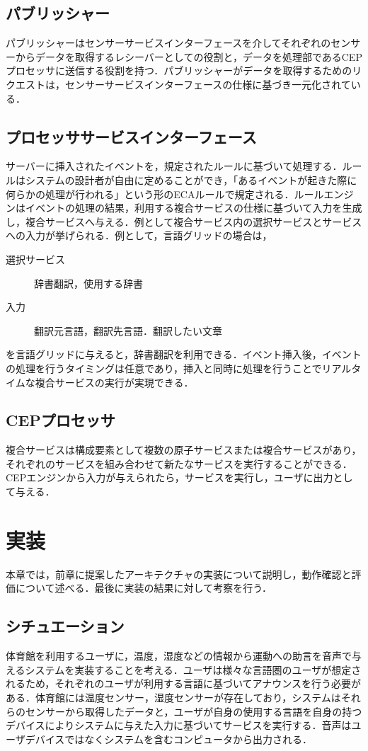 \documentclass{kuisthesis}			%
\begin{document}
\subsection{パブリッシャー}
パブリッシャーはセンサーサービスインターフェースを介してそれぞれのセンサーからデータを取得するレシーバーとしての役割と，データを処理部であるCEPプロセッサに送信する役割を持つ．パブリッシャーがデータを取得するためのリクエストは，センサーサービスインターフェースの仕様に基づき一元化されている．
\subsection{プロセッササービスインターフェース}
サーバーに挿入されたイベントを，規定されたルールに基づいて処理する．ルールはシステムの設計者が自由に定めることができ，「あるイベントが起きた際に何らかの処理が行われる」という形のECAルールで規定される．ルールエンジンはイベントの処理の結果，利用する複合サービスの仕様に基づいて入力を生成し，複合サービスへ与える．例として複合サービス内の選択サービスとサービスへの入力が挙げられる．例として，言語グリッドの場合は，
\begin{description}
\item[選択サービス] 辞書翻訳，使用する辞書
\item[入力] 翻訳元言語，翻訳先言語．翻訳したい文章
\end{description}
を言語グリッドに与えると，辞書翻訳を利用できる．イベント挿入後，イベントの処理を行うタイミングは任意であり，挿入と同時に処理を行うことでリアルタイムな複合サービスの実行が実現できる．
\subsection{CEPプロセッサ}
複合サービスは構成要素として複数の原子サービスまたは複合サービスがあり，それぞれのサービスを組み合わせて新たなサービスを実行することができる．CEPエンジンから入力が与えられたら，サービスを実行し，ユーザに出力として与える．
\section{実装}
本章では，前章に提案したアーキテクチャの実装について説明し，動作確認と評価について述べる．最後に実装の結果に対して考察を行う．


\subsection{シチュエーション}
体育館を利用するユーザに，温度，湿度などの情報から運動への助言を音声で与えるシステムを実装することを考える．ユーザは様々な言語圏のユーザが想定されるため，それぞれのユーザが利用する言語に基づいてアナウンスを行う必要がある．体育館には温度センサー，湿度センサーが存在しており，システムはそれらのセンサーから取得したデータと，ユーザが自身の使用する言語を自身の持つデバイスによりシステムに与えた入力に基づいてサービスを実行する．音声はユーザデバイスではなくシステムを含むコンピュータから出力される．
\end{document}

